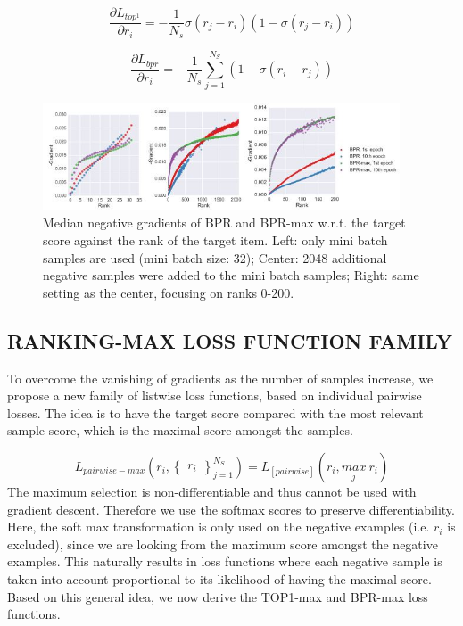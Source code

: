 \begin{equation}\label{eq:6}
    \frac{\partial L_{top^1}}{\partial r_i} = - \frac{1}{N_s} \sigma (r_j - r_i) (1 - \sigma (r_j - r_i))
\end{equation}

\begin{equation}\label{eq:7}
    \frac{\partial L_{bpr}}{\partial r_i} = - \frac{1}{N_s} \sum_{j=1}^{N_S} (1 - \sigma (r_i - r_j)  )
\end{equation}

\graphicspath{{img/}}

\begin{figure}[htp]
    \centering
    \includegraphics[width=400]{p2}
    \caption{Median negative gradients of BPR and BPR-max w.r.t. the target score against the rank of the target item. Left: only mini batch samples are used (mini batch size: 32); Center: 2048 additional negative samples were added to the mini batch samples; Right: same setting as the center, focusing on ranks 0-200.}
    \label{fig:galaxy}
\end{figure}

\subsection{ RANKING-MAX LOSS FUNCTION FAMILY}
To overcome the vanishing of gradients as the number of samples increase, we propose a new family of listwise loss functions, based on individual pairwise losses. The idea is to have the target score compared with the most relevant sample score, which is the maximal score amongst the samples.

\begin{equation}\label{eq:8}
    L_{pairwise-max}\left ( r_i,\begin{Bmatrix}
r_i
\end{Bmatrix}_{j=1}^{N_S} \right ) = L_[pairwise]\left ( r_i,  \underset{j}{max} \ r_i\right )
\end{equation}
The maximum selection is non-differentiable and thus cannot be used with gradient descent. Therefore we use the softmax scores to preserve differentiability. Here, the soft max transformation is
only used on the negative examples (i.e. $r_i$ is excluded), since we are looking from the maximum score amongst the negative examples. This naturally results in loss functions where each negative sample is taken into account proportional to its likelihood of having the maximal score. Based on this general idea, we now derive the TOP1-max and BPR-max loss functions.

